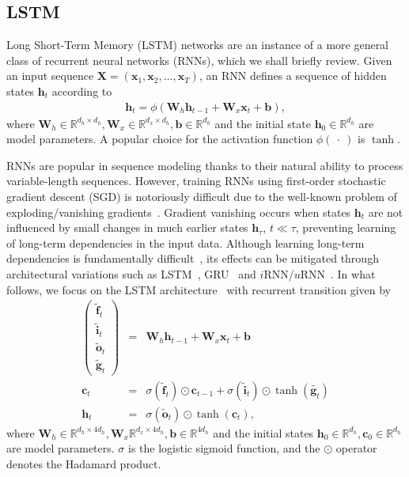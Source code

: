 \documentclass{article} %
\newcommand{\vect}[1]{\mathbf{#1}}
\newcommand{\mat}[1]{\mathbf{#1}}
\newcommand{\ewprod}{\odot}
\newcommand{\reals}{\mathbb{R}}
\begin{document}
\subsection{LSTM}

Long Short-Term Memory (LSTM) networks are an instance of a more general class of recurrent neural networks (RNNs),
which we shall briefly review.
Given an input sequence $\mat{X} = ( \vect{x}_1, \vect{x}_2, \ldots, \vect{x}_T )$,
an RNN defines a sequence of hidden states $\vect{h}_t$ according to
\begin{eqnarray}
  \vect{h}_t = \phi(\mat{W}_h \vect{h}_{t-1} + \mat{W}_x  \vect{x}_t + \vect{b}),
\end{eqnarray}
where $\mat{W}_h \in \reals^{d_h \times d_h}, \mat{W}_x \in \reals^{d_x \times d_h}, \vect{b} \in \reals^{d_h}$
and the initial state $\vect{h}_0 \in \reals^{d_h}$ %
are model parameters.
A popular choice for the activation function $\phi(\ \cdot\ )$ is $\tanh$.

RNNs are popular in sequence modeling thanks to their natural ability to process variable-length sequences.
However, training RNNs using first-order stochastic gradient descent (SGD) is notoriously difficult
due to the well-known problem of exploding/vanishing gradients~\citep{bengio1994learning,hochreiter1991untersuchungen,pascanudifficulty}.
Gradient vanishing occurs when states $\vect{h}_t$ are not influenced by small changes in much earlier states $\vect{h}_{\tau}$, $t \ll \tau$,
preventing learning of long-term dependencies in the input data.
Although learning long-term dependencies is fundamentally difficult~\citep{bengio1994learning},
its effects can be mitigated through architectural variations such as LSTM~\citep{lstm}, GRU~\citep{cho2014learning} and $i$RNN/$u$RNN~\citep{le2015simple,urnn}.
In what follows, we focus on the LSTM architecture~\citep{lstm} with recurrent transition given by
\begin{eqnarray}
\left(\begin{array}{ccc}
\tilde{\vect{f}}_t \\
\tilde{\vect{i}}_t \\
\tilde{\vect{o}}_t \\
\tilde{\vect{g}}_t
\end{array}\right)
 &=&
 \mat{W}_h \vect{h}_{t-1} +
 \mat{W}_x \vect{x}_t +
 \vect{b}
 \\
\vect{c}_t &= &\sigma(\tilde{\vect{f}}_t) \ewprod \vect{c}_{t-1} +
\sigma(\tilde{\vect{i}}_t) \ewprod \tanh(\tilde{\vect{g}_t}) \\
\vect{h}_t &= &\sigma(\tilde{\vect{o}}_t) \ewprod \tanh(\vect{c}_t),
\end{eqnarray}
where $\vect{W}_h \in \reals^{d_h \times 4 d_h}, \vect{W}_x \reals^{d_x \times 4 d_h}, \vect{b} \in \reals^{4 d_h}$
and the initial states $\vect{h}_0 \in \reals^{d_h}, \vect{c}_0 \in \reals^{d_h}$ %
are model parameters.
$\sigma$ is the logistic sigmoid function, and the $\ewprod$ operator denotes the Hadamard product.
\end{document}
